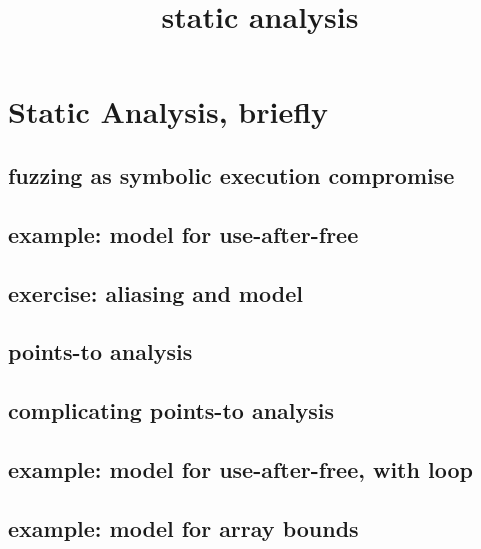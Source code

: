 \graphicspath{{./figures/}}
\title{static analysis}
\date{}

\begin{frame}
    \titlepage
\end{frame}



\section{Static Analysis, briefly}

\subsection{fuzzing as symbolic execution compromise}


\subsection{example: model for use-after-free}


\subsection{exercise: aliasing and model}


\subsection{points-to analysis}

\subsection{complicating points-to analysis}


\subsection{example: model for use-after-free, with loop}


\subsection{example: model for array bounds}


